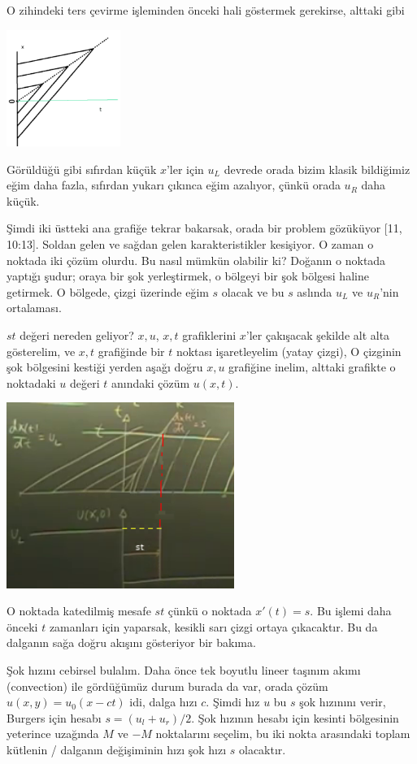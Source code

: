 \documentclass[12pt,fleqn]{article}\usepackage{../../common}
\begin{document}
O zihindeki ters çevirme işleminden önceki hali göstermek gerekirse, alttaki gibi

\includegraphics[width=10em]{compscieng_bpp50fv1_04.png}

Görüldüğü gibi sıfırdan küçük $x$'ler için $u_L$ devrede orada bizim klasik
bildiğimiz eğim daha fazla, sıfırdan yukarı çıkınca eğim azalıyor, çünkü
orada $u_R$ daha küçük.

Şimdi iki üstteki ana grafiğe tekrar bakarsak, orada bir problem gözüküyor
[11, 10:13]. Soldan gelen ve sağdan gelen karakteristikler kesişiyor. O zaman
o noktada iki çözüm olurdu. Bu nasıl mümkün olabilir ki? Doğanın o noktada
yaptığı şudur; oraya bir şok yerleştirmek, o bölgeyi bir şok bölgesi haline
getirmek. O bölgede, çizgi üzerinde eğim $s$ olacak ve bu $s$ aslında $u_L$
ve $u_R$'nin ortalaması.

$st$ değeri nereden geliyor? $x,u$, $x,t$ grafiklerini $x$'ler çakışacak şekilde
alt alta gösterelim, ve $x,t$ grafiğinde bir $t$ noktası işaretleyelim (yatay
çizgi), O çizginin şok bölgesini kestiği yerden aşağı doğru $x,u$ grafiğine
inelim, alttaki grafikte o noktadaki $u$ değeri $t$ anındaki çözüm $u(x,t)$.

\includegraphics[width=20em]{compscieng_bpp50fv1_05.png}

O noktada katedilmiş mesafe $st$ çünkü o noktada $x'(t) = s$. Bu işlemi daha
önceki $t$ zamanları için yaparsak, kesikli sarı çizgi ortaya çıkacaktır. Bu da
dalganın sağa doğru akışını gösteriyor bir bakıma.

Şok hızını cebirsel bulalım. Daha önce tek boyutlu lineer taşınım akımı
(convection) ile gördüğümüz durum burada da var, orada çözüm $u(x,y) =
u_0(x-ct)$ idi, dalga hızı $c$. Şimdi hız $u$ bu $s$ şok hızınını verir, Burgers
için hesabı $s = (u_l + u_r) / 2$.  Şok hızının hesabı için kesinti bölgesinin
yeterince uzağında $M$ ve $-M$ noktalarını seçelim, bu iki nokta arasındaki
toplam kütlenin / dalganın değişiminin hızı şok hızı $s$ olacaktır.
\end{document}
